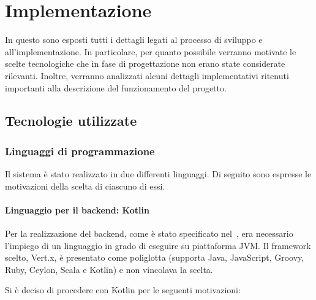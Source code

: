 \chapter{Implementazione}\label{ch:implementation}
  In questo  sono esposti tutti i dettagli legati al processo di sviluppo e all'implementazione.
  In particolare, per quanto possibile verranno motivate le scelte tecnologiche che in fase di progettazione non erano state considerate rilevanti.
  Inoltre, verranno analizzati alcuni dettagli implementativi ritenuti importanti alla descrizione del funzionamento del progetto.

  \section{Tecnologie utilizzate}

    \subsection{Linguaggi di programmazione}
      Il sistema è stato realizzato in due differenti linguaggi. Di seguito sono espresse le motivazioni della scelta di ciascuno di essi.

      \subsubsection{Linguaggio per il backend: Kotlin}

        Per la realizzazione del backend, come è stato specificato nel~, era necessario l'impiego di un linguaggio in grado di eseguire su piattaforma JVM\@.
        Il framework scelto, Vert.x, è presentato come poliglotta (supporta Java, JavaScript, Groovy, Ruby, Ceylon, Scala e Kotlin) e non vincolava la scelta.

        Si è deciso di procedere con Kotlin per le seguenti motivazioni:

